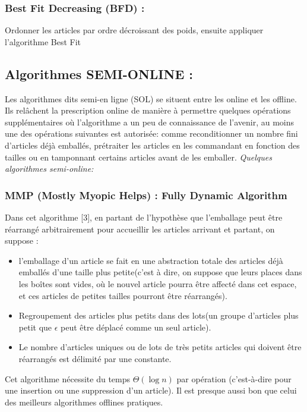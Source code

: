 \documentclass[class=report, crop=false]{standalone}
\begin{document}
        \subsubsection{Best Fit Decreasing (BFD) :}
        Ordonner les articles par ordre décroissant des poids, ensuite appliquer l’algorithme Best Fit
        \subsection{Algorithmes SEMI-ONLINE :}
        Les algorithmes dits semi-en ligne (SOL) se situent entre les online et les offline. Ils relâchent la prescription online de manière à permettre quelques opérations supplémentaires où l'algorithme a un peu de connaissance de l'avenir, au moins une des opérations suivantes est autorisée: comme reconditionner un nombre fini d'articles déjà emballés, prétraiter les articles en les commandant en fonction des tailles ou en tamponnant certains articles avant de les emballer. 
        \emph{Quelques algorithmes semi-online:}
        \subsubsection{MMP (Mostly Myopic Helps) : Fully Dynamic Algorithm}
        Dans cet algorithme [3], en partant de l’hypothèse que l'emballage peut être réarrangé arbitrairement pour accueillir les articles arrivant et partant, on suppose :
        \renewcommand{\labelitemi}{$\circ$}  
        \begin{itemize}
            \item l’emballage d’un article se fait en une abstraction totale des articles déjà emballés d’une taille plus petite(c’est à dire, on suppose que leurs places dans les boîtes sont vides, où le nouvel article pourra être affecté dans cet espace, et ces articles de petites tailles pourront être réarrangés).
            \item Regroupement des articles plus petits dans des lots(un groupe d'articles plus petit que \(\epsilon\) peut être déplacé comme un seul article).
            \item Le nombre d'articles uniques ou de lots de très petits articles qui doivent être réarrangés est délimité par une constante.
        \end{itemize}
        Cet algorithme nécessite du temps \(\Theta(\log n)\) par opération (c'est-à-dire pour une insertion ou une suppression d'un article). Il est presque aussi bon que celui des meilleurs algorithmes offlines pratiques.
\end{document}

